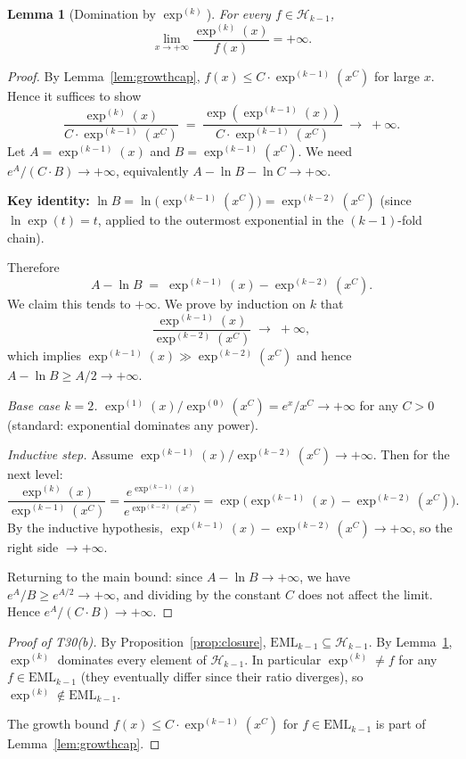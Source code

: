 \documentclass[12pt,a4paper]{article}
\newtheorem{lemma}[theorem]{Lemma}
\theoremstyle{definition}
\theoremstyle{remark}
\begin{document}
\begin{lemma}[Domination by $\exp^{(k)}$]\label{lem:dom}
For every $f\in\mathcal{H}_{k-1}$,
\[
  \lim_{x\to+\infty}\frac{\exp^{(k)}(x)}{f(x)} = +\infty.
\]
\end{lemma}

\begin{proof}
By Lemma~\ref{lem:growthcap}, $f(x)\leq C\cdot\exp^{(k-1)}(x^C)$ for
large $x$.  Hence it suffices to show
\[
  \frac{\exp^{(k)}(x)}{C\cdot\exp^{(k-1)}(x^C)}
  \;=\;
  \frac{\exp(\exp^{(k-1)}(x))}{C\cdot\exp^{(k-1)}(x^C)}
  \;\to\; +\infty.
\]
Let $A = \exp^{(k-1)}(x)$ and $B = \exp^{(k-1)}(x^C)$.  We need
$e^A / (C \cdot B) \to +\infty$, equivalently $A - \ln B - \ln C \to +\infty$.

\textbf{Key identity:}
$\ln B = \ln\bigl(\exp^{(k-1)}(x^C)\bigr) = \exp^{(k-2)}(x^C)$
(since $\ln\exp(t)=t$, applied to the outermost exponential in the
$(k-1)$-fold chain).

Therefore
\[
  A - \ln B \;=\; \exp^{(k-1)}(x) - \exp^{(k-2)}(x^C).
\]
We claim this tends to $+\infty$.  We prove by induction on $k$ that
\[
  \frac{\exp^{(k-1)}(x)}{\exp^{(k-2)}(x^C)} \;\to\; +\infty,
\]
which implies $\exp^{(k-1)}(x) \gg \exp^{(k-2)}(x^C)$ and hence
$A - \ln B \geq A/2 \to +\infty$.

\emph{Base case $k=2$.}
$\exp^{(1)}(x)/\exp^{(0)}(x^C) = e^x / x^C \to +\infty$ for any $C>0$
(standard: exponential dominates any power).

\emph{Inductive step.}
Assume $\exp^{(k-1)}(x)/\exp^{(k-2)}(x^C) \to +\infty$.
Then for the next level:
\[
  \frac{\exp^{(k)}(x)}{\exp^{(k-1)}(x^C)}
  = \frac{e^{\exp^{(k-1)}(x)}}{e^{\exp^{(k-2)}(x^C)}}
  = \exp\!\bigl(\exp^{(k-1)}(x) - \exp^{(k-2)}(x^C)\bigr).
\]
By the inductive hypothesis, $\exp^{(k-1)}(x) - \exp^{(k-2)}(x^C) \to +\infty$,
so the right side $\to +\infty$.

Returning to the main bound: since $A - \ln B \to +\infty$, we have
$e^A / B \geq e^{A/2} \to +\infty$, and dividing by the constant $C$ does not
affect the limit.  Hence $e^A/(C \cdot B) \to +\infty$.
\end{proof}

\begin{proof}[Proof of T30(b)]
By Proposition~\ref{prop:closure}, $\mathrm{EML}_{k-1}\subseteq\mathcal{H}_{k-1}$.
By Lemma~\ref{lem:dom}, $\exp^{(k)}$ dominates every element of $\mathcal{H}_{k-1}$.
In particular $\exp^{(k)}\neq f$ for any $f\in\mathrm{EML}_{k-1}$ (they
eventually differ since their ratio diverges), so
$\exp^{(k)}\notin\mathrm{EML}_{k-1}$.

The growth bound $f(x)\leq C\cdot\exp^{(k-1)}(x^C)$ for
$f\in\mathrm{EML}_{k-1}$ is part of Lemma~\ref{lem:growthcap}.
\end{proof}
\end{document}
